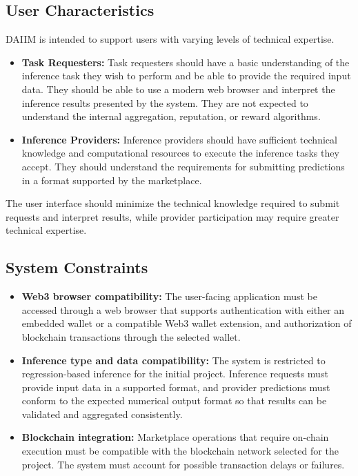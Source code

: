 \documentclass[12pt]{article}
\begin{document}
\subsection{User Characteristics} \label{SecUserCharacteristics}
DAIIM is intended to support users with varying levels of technical expertise.
\begin{itemize}
\item \textbf{Task Requesters:} Task requesters should have a basic understanding of the inference task they wish to perform and be able to provide the required input data. They should be able to use a modern web browser and interpret the inference results presented by the system. They are not expected to understand the internal aggregation, reputation, or reward algorithms.
\item \textbf{Inference Providers:} Inference providers should have sufficient technical knowledge and computational resources to execute the inference tasks they accept. They should understand the requirements for submitting predictions in a format supported by the marketplace.


\end{itemize}
The user interface should minimize the technical knowledge required to submit requests and interpret results, while provider participation may require greater technical expertise.



\subsection{System Constraints}

\begin{itemize}
\item \textbf{Web3 browser compatibility:} The user-facing application must be accessed through a web browser that supports authentication with either an embedded wallet or a compatible Web3 wallet extension, and authorization of blockchain transactions through the selected wallet.
\item \textbf{Inference type and data compatibility:} The system is restricted to regression-based inference for the initial project. Inference requests must provide input data in a supported format, and provider predictions must conform to the expected numerical output format so that results can be validated and aggregated consistently.
\item \textbf{Blockchain integration:} Marketplace operations that require on-chain execution must be compatible with the blockchain network selected for the project. The system must account for possible transaction delays or failures.
\end{itemize}
\end{document}
